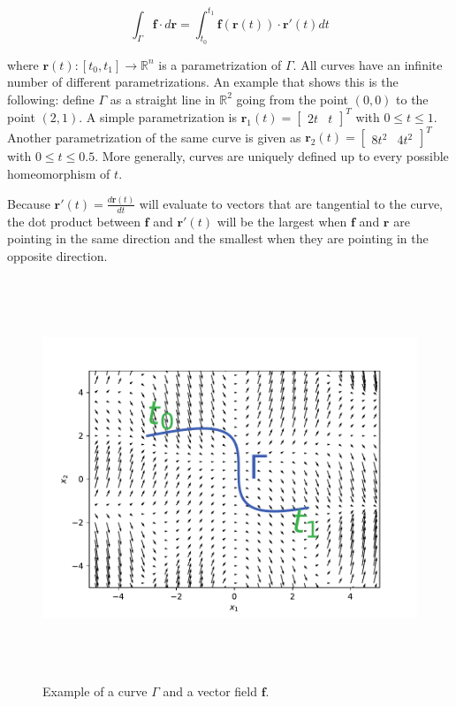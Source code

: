 \documentclass[12pt,a4paper]{book}
\begin{document}
\begin{equation}
    \int_{\Gamma} \bm{f} \cdot d \bm{r} = \int_{t_0}^{t_1} \bm{f}(\bm{r}(t)) \cdot \bm{r}'(t) dt
\end{equation}

\noindent where $\bm{r}(t): [t_0, t_1] \rightarrow \mathbb{R}^n$ is a parametrization of $\Gamma$. All curves have an infinite number of different parametrizations. An example that shows this is the following: define $\Gamma$ as a straight line in $\mathbb{R}^2$ going from the point $(0, 0)$ to the point $(2, 1)$. A simple parametrization is $\bm{r}_1(t) = \begin{bmatrix} 2 t & t \end{bmatrix}^T$ with $0 \leq t \leq 1$. Another parametrization of the same curve is given as $\bm{r}_2(t) = \begin{bmatrix} 8 t^2 & 4 t^2 \end{bmatrix}^T$ with $0 \leq t \leq 0.5$. More generally, curves are uniquely defined up to every possible homeomorphism of $t$.

Because $\bm{r}'(t) = \frac{d \bm{r}(t)}{dt}$ will evaluate to vectors that are tangential to the curve, the dot product between $\bm{f}$ and $\bm{r}'(t)$ will be the largest when $\bm{f}$ and $\bm{r}$ are pointing in the same direction and the smallest when they are pointing in the opposite direction.

\begin{figure}[H]
    \centering
    \includegraphics[height=12cm]{figs/plots/motion_classification/line_integral.pdf}
    \caption{Example of a curve $\Gamma$ and a vector field $\bm{f}$.}
    \label{fig:line_integral_field}
\end{figure}
\end{document}
